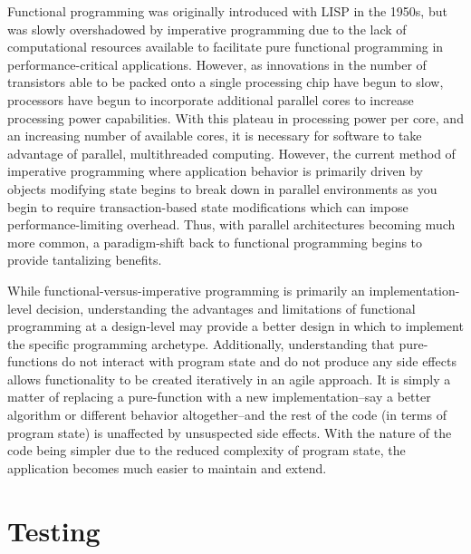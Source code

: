 Functional programming was originally introduced with LISP in the 1950s, but was slowly overshadowed by imperative programming due to the lack of computational resources available to facilitate pure functional programming in performance-critical applications. However, as innovations in the number of transistors able to be packed onto a single processing chip have begun to slow, processors have begun to incorporate additional parallel cores to increase processing power capabilities. With this plateau in processing power per core, and an increasing number of available cores, it is necessary for software to take advantage of parallel, multithreaded computing. However, the current method of imperative programming where application behavior is primarily driven by objects modifying state begins to break down in parallel environments as you begin to require transaction-based state modifications which can impose performance-limiting overhead. Thus, with parallel architectures becoming much more common, a paradigm-shift back to functional programming begins to provide tantalizing benefits.

While functional-versus-imperative programming is primarily an implementation-level decision, understanding the advantages and limitations of functional programming at a design-level may provide a better design in which to implement the specific programming archetype. Additionally, understanding that pure-functions do not interact with program state and do not produce any side effects allows functionality to be created iteratively in an agile approach. It is simply a matter of replacing a pure-function with a new implementation--say a better algorithm or different behavior altogether--and the rest of the code (in terms of program state) is unaffected by unsuspected side effects. With the nature of the code being simpler due to the reduced complexity of program state, the application becomes much easier to maintain and extend.

\section{Testing}

